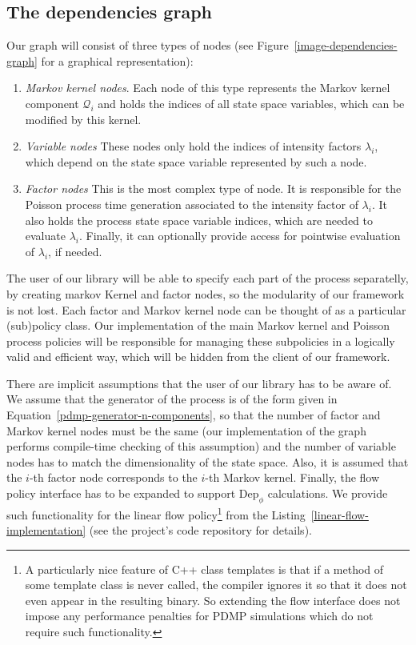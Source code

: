 \documentclass[report.tex]{subfiles}
\begin{document}
\subsection{The dependencies graph}

Our graph will consist of three types of nodes (see Figure~\ref{image-dependencies-graph}
for a graphical representation):
\begin{enumerate}
  \item \textit{Markov kernel nodes}. Each node of this type represents the Markov
    kernel component $\mathcal{Q}_{i}$ and holds the indices of all state space variables,
    which can be modified by this kernel.
  \item \textit{Variable nodes}
    These nodes only hold the indices of intensity factors $\lambda_{i}$,
    which depend on the state space variable represented by such a node.
  \item \textit{Factor nodes}
    This is the most complex type of node.
    It is responsible for the Poisson process time generation associated to
    the intensity factor of $\lambda_{i}$. It also holds the process state space
    variable indices, which are needed to evaluate $\lambda_{i}$. Finally, it
    can optionally provide access for pointwise evaluation of $\lambda_{i}$, if
    needed.
\end{enumerate}
The user of our library will be able to specify each part of
the process separatelly, by creating markov Kernel and factor nodes,
so the modularity of our framework is not lost.
Each factor and Markov kernel node can be thought of as a particular (sub)policy class.
Our implementation of the
main Markov kernel and Poisson process policies will be responsible for managing
these subpolicies in a logically valid and efficient way, which will be hidden
from the client of our framework.

There are implicit assumptions that the user of our library has to be aware of.
We assume that the generator of the process is
of the form given in Equation~\ref{pdmp-generator-n-components}, so that the
number of factor and Markov kernel nodes must be the same (our implementation
of the graph performs compile-time checking of this assumption) and the number
of variable nodes has to match the dimensionality of the state space.
Also, it is assumed that the $i$-th factor node corresponds to the $i$-th Markov kernel.
Finally, the flow policy interface has to be expanded to support
$\text{Dep}_{\phi}$ calculations.
We provide such functionality for the linear flow policy\footnote{
  A particularly nice feature of C++ class templates
  is that if a method of some template class is never called, the compiler ignores it
  so that it does not even appear in the resulting binary.
  So extending the flow interface does not impose any performance penalties
  for PDMP simulations which do not require such functionality.}
from the Listing~\ref{linear-flow-implementation}
(see the project's code repository for details).
\end{document}
